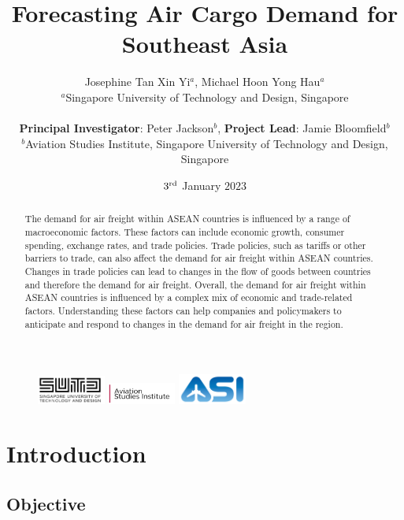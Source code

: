 \documentclass{article}
\title{Forecasting Air Cargo Demand for Southeast Asia}
\author{Josephine Tan Xin Yi$^{a}$, Michael Hoon Yong Hau$^{a}$\\
        \small $^{a}$Singapore University of Technology and Design, Singapore \\\\
        \small \textbf{Principal Investigator}: Peter Jackson$^{b}$, \textbf{Project Lead}: Jamie Bloomfield$^{b}$ \\
        \small $^{b}$Aviation Studies Institute, Singapore University of Technology and Design, Singapore \\
}
\date{$3\textsuperscript{rd}$ January $2023$} %
\begin{document}
\maketitle

\begin{figure}[t!]
    \centering
    \includegraphics[width=0.2\textwidth]{images/ASI Graphics/sutd-asi-logo-web-2021-fc.png}
    \includegraphics[width=0.2\textwidth]{images/ASI Graphics/asi-logo-web-2022-fc.png}
    \includegraphics[width=0.2\textwidth]{images/ASI Graphics/asi-logo-web-2021-fc-02-v2.png}
    \label{titlefig}
\end{figure}

\begin{abstract} 
\noindent The demand for air freight within ASEAN countries is influenced by a range of macroeconomic factors. These factors can include economic growth, consumer spending, exchange rates, and trade policies. Trade policies, such as tariffs or other barriers to trade, can also affect the demand for air freight within ASEAN countries. Changes in trade policies can lead to changes in the flow of goods between countries and therefore the demand for air freight. Overall, the demand for air freight within ASEAN countries is influenced by a complex mix of economic and trade-related factors. Understanding these factors can help companies and policymakers to anticipate and respond to changes in the demand for air freight in the region.
\end{abstract}

\noindent{}

\newpage

\tableofcontents

\newpage

\section{Introduction}

\subsection{Objective}
\end{document}
